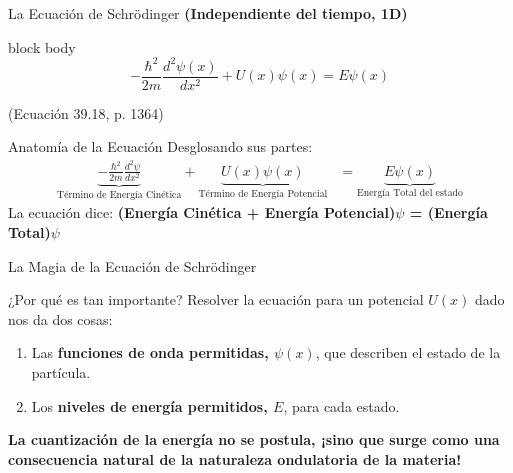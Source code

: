 	\begin{frame}{La Ecuación de Schrödinger}
		\centering\textbf{(Independiente del tiempo, 1D)}\medskip
		\begin{beamercolorbox}[sep=0.3cm,center,wd=\textwidth]{block body}
			\Huge
			\begin{equation*}
				-\frac{\hbar^2}{2m} \frac{d^2\psi(x)}{dx^2} + U(x)\psi(x) = E\psi(x)
			\end{equation*}
		\end{beamercolorbox}
		\medskip
		\centering (Ecuación 39.18, p. 1364)
	\end{frame}
	
	\begin{frame}{Anatomía de la Ecuación}
		Desglosando sus partes:
		\begin{align*}
			\underbrace{-\frac{\hbar^2}{2m} \frac{d^2\psi}{dx^2}}_{\text{Término de Energía Cinética}} + \underbrace{U(x)\psi(x)}_{\text{Término de Energía Potencial}} &= \underbrace{E\psi(x)}_{\text{Energía Total del estado}}
		\end{align*}
		\vspace{1em}
		La ecuación dice: \textbf{(Energía Cinética + Energía Potencial)$\psi$ = (Energía Total)$\psi$}
	\end{frame}
	
	\begin{frame}{La Magia de la Ecuación de Schrödinger}
		\begin{block}{¿Por qué es tan importante?}
			Resolver la ecuación para un potencial $U(x)$ dado nos da dos cosas:
			\begin{enumerate}
				\item Las \textbf{funciones de onda permitidas, $\psi(x)$}, que describen el estado de la partícula.
				\item Los \textbf{niveles de energía permitidos, $E$}, para cada estado.
			\end{enumerate}
		\end{block}
		\pause
		\begin{alertblock}{}
			\centering
			\textbf{La cuantización de la energía no se postula, ¡sino que surge como una consecuencia natural de la naturaleza ondulatoria de la materia!}
		\end{alertblock}
	\end{frame}
	
